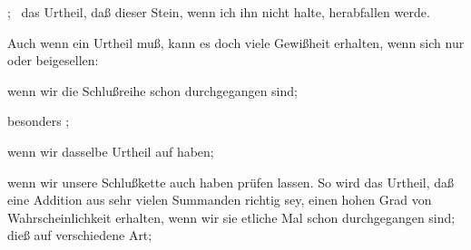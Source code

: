 \begin{aufza}
\item {}; \zB\ das Urtheil, daß dieser Stein, wenn ich ihn nicht halte, herabfallen werde.
\item Auch wenn ein Urtheil  muß, kann es doch viele Gewißheit erhalten, wenn sich nur  oder  beigesellen: 
\begin{inparaenum}[a)] 
\item wenn wir die Schlußreihe schon  durchgegangen sind; 
\item besonders ; 
\item wenn wir dasselbe Urtheil auf  haben; 
\item wenn wir unsere Schlußkette auch  haben prüfen lassen. So wird das Urtheil, daß eine Addition aus sehr vielen Summanden richtig sey, einen hohen Grad von Wahrscheinlichkeit erhalten, wenn wir sie etliche Mal schon durchgegangen sind; dieß auf verschiedene Art; \usw 
\end{inparaenum}

\end{aufza}
